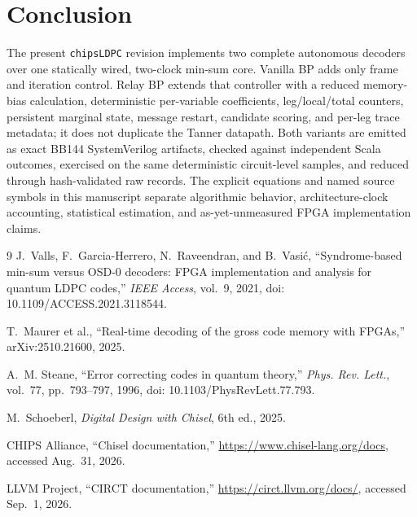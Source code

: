 \documentclass[10pt,conference]{IEEEtran}
\begin{document}
\section{Conclusion}
The present \texttt{chipsLDPC} revision implements two complete autonomous
decoders over one statically wired, two-clock min-sum core.  Vanilla BP adds
only frame and iteration control.  Relay BP extends that controller with a
reduced memory-bias calculation, deterministic per-variable coefficients,
leg/local/total counters, persistent marginal state, message restart, candidate
scoring, and per-leg trace metadata; it does not duplicate the Tanner datapath.
Both variants are emitted as exact BB144 SystemVerilog artifacts, checked
against independent Scala outcomes, exercised on the same deterministic
circuit-level samples, and reduced through hash-validated raw records.  The
explicit equations and named source symbols in this manuscript separate
algorithmic behavior, architecture-clock accounting, statistical estimation,
and as-yet-unmeasured FPGA implementation claims.

\begin{thebibliography}{9}
J.~Valls, F.~Garcia-Herrero, N.~Raveendran, and B.~Vasi\'{c},
``Syndrome-based min-sum versus OSD-0 decoders: FPGA implementation and
analysis for quantum LDPC codes,'' \emph{IEEE Access}, vol.~9, 2021,
doi: 10.1109/ACCESS.2021.3118544.

T.~Maurer et al., ``Real-time decoding of the gross code memory with FPGAs,''
arXiv:2510.21600, 2025.

A.~M. Steane, ``Error correcting codes in quantum theory,''
\emph{Phys. Rev. Lett.}, vol.~77, pp.~793--797, 1996,
doi: 10.1103/PhysRevLett.77.793.

M.~Schoeberl, \emph{Digital Design with Chisel}, 6th ed., 2025.

CHIPS Alliance, ``Chisel documentation,''
\url{https://www.chisel-lang.org/docs}, accessed Aug.~31, 2026.

LLVM Project, ``CIRCT documentation,''
\url{https://circt.llvm.org/docs/}, accessed Sep.~1, 2026.
\end{thebibliography}
\end{document}
